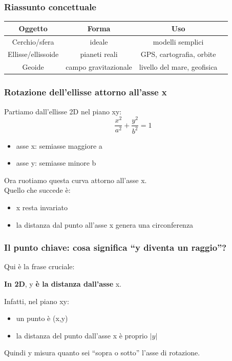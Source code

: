 \documentclass[a4paper,14pt]{article}
\begin{document}
\subsubsection{Riassunto concettuale}
\begin{table}[h!]
\begin{center}
\begin{tabular}{|c|c|c|c|}
\hline
\textbf{Oggetto}&\textbf{Forma}&\textbf{Uso}\\
\hline
Cerchio/sfera& ideale& modelli semplici\\
\hline
Ellisse/ellissoide& pianeti reali& GPS, cartografia, orbite\\
\hline
Geoide& campo gravitazionale& livello del mare, geofisica\\
\hline
\end{tabular}
\end{center}
\end{table}
\subsubsection{Rotazione dell’ellisse attorno all’asse x}
Partiamo dall’ellisse 2D nel piano xy:\\

\[ \frac{x^2}{a^2}+\frac{y^2}{b^2}=1 \]
\begin{itemize}
\item asse x: semiasse maggiore a
\item asse y: semiasse minore b
\end{itemize}
Ora ruotiamo questa curva attorno all’asse x.\\

Quello che succede è:

\begin{itemize}
\item x resta invariato
\item la distanza dal punto all’asse x genera una circonferenza
\end{itemize}

\subsubsection{Il punto chiave: cosa significa “y diventa un raggio”?}
Qui è la frase cruciale:

\textbf{In 2D}, y \textbf{è la distanza dall’asse} x.

Infatti, nel piano xy:
\begin{itemize}
\item un punto è (x,y)
\item la distanza del punto dall’asse x è proprio \(|y|\)
\end{itemize}
Quindi y misura quanto sei “sopra o sotto” l’asse di rotazione.\\
\end{document}
